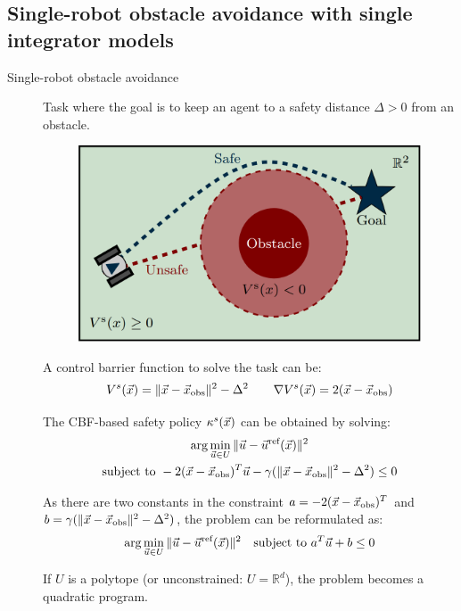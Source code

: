 \subsection{Single-robot obstacle avoidance with single integrator models}

\begin{description}
    \item[Single-robot obstacle avoidance]  
        Task where the goal is to keep an agent to a safety distance $\Delta > 0$ from an obstacle.

        \begin{figure}[H]
            \centering
            \includegraphics[width=0.35\linewidth]{./img/safety_control_single.png}
        \end{figure}

        A control barrier function to solve the task can be:
        \[
            V^s({\vec{x}}) = \Vert {\vec{x}} - {\vec{x}}_\text{obs} \Vert^2 - \Delta^2
            \qquad
            \nabla V^s({\vec{x}}) = 2({\vec{x}} - {\vec{x}}_\text{obs})
        \]

        The CBF-based safety policy $\kappa^s({\vec{x}})$ can be obtained by solving:
        \[
            \begin{gathered}
                \arg\min_{{\vec{u}} \in U} \Vert {\vec{u}} - {\vec{u}}^\text{ref}({\vec{x}}) \Vert^2 \\
                \text{subject to } -2({\vec{x}}-{\vec{x}}_\text{obs})^T {\vec{u}} - \gamma(\Vert {\vec{x}}-{\vec{x}}_\text{obs} \Vert^2 - \Delta^2) \leq 0
            \end{gathered}
        \]

        As there are two constants in the constraint $a = -2({\vec{x}}-{\vec{x}}_\text{obs})^T$ and $b = \gamma(\Vert {\vec{x}}-{\vec{x}}_\text{obs} \Vert^2 - \Delta^2)$, the problem can be reformulated as:
        \[
            \arg\min_{{\vec{u}} \in U} \Vert {\vec{u}} - {\vec{u}}^\text{ref}({\vec{x}}) \Vert^2 \quad \text{subject to } a^T {\vec{u}} + b \leq 0
        \]
        
        \begin{remark}
            If $U$ is a polytope (or unconstrained: $U = \mathbb{R}^d$), the problem becomes a quadratic program.
        \end{remark}
\end{description}


